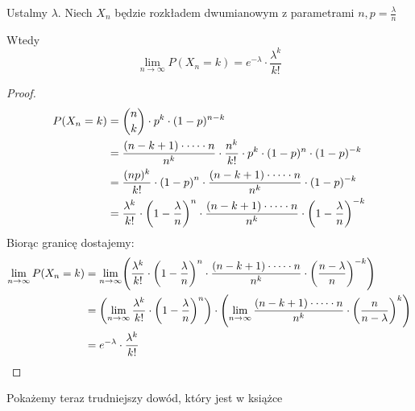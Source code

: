 \begin{theorem}
    Ustalmy \( \lambda \).
    Niech \( X_n \) będzie rozkładem dwumianowym z parametrami \( n,  p = \frac{\lambda}{n} \)
    
    Wtedy
    \[
        \lim_{n \rightarrow \infty} P(X_n = k) = e^{-\lambda} \cdot \frac{\lambda^k}{k!}
    \]
\end{theorem}
\begin{proof}
    \begin{align*}
        P(X_n = k) 
            &= \binom{n}{k} \cdot p^k \cdot (1-p)^{n-k} \\
            &= \frac{(n-k+1)\cdot \dots \cdot n}{n^k} \cdot \frac{n^k}{k!} \cdot p^k \cdot (1-p)^n \cdot (1-p)^{-k} \\
            &= \frac{(np)^k}{k!} \cdot \left(1 - p\right)^{n} \cdot
            \frac{(n-k+1)\cdot \dots \cdot n}{n^k} \cdot (1-p)^{-k} \\
            &= \frac{\lambda^k}{k!} \cdot \left(1 - \frac{\lambda}{n}\right)^{n} \cdot \frac{(n-k+1)\cdot \dots \cdot n}{n^k} \cdot \left(1-\frac{\lambda}{n}\right)^{-k} \\
    \end{align*}
    Biorąc granicę dostajemy:
    \begin{align*}
        \lim_{n \rightarrow \infty} P(X_n = k) 
            &= 
              \lim_{n \rightarrow \infty} \pars{ \frac{\lambda^k}{k!} \cdot \pars{1 - \frac{\lambda}{n}}^{n} \cdot \frac{(n-k+1)\cdot \dots \cdot n}{n^k} \cdot \pars{\frac{n - \lambda}{n}}^{-k}} \\
            &= \pars{\lim_{n \rightarrow \infty} \frac{\lambda^k}{k!} \cdot \pars{1 - \frac{\lambda}{n}}^{n}}
                \cdot
                \pars{
                \lim_{n \rightarrow \infty}\frac{(n-k+1)\cdot \dots \cdot n}{n^k} \cdot \pars{\frac{n}{n - \lambda}}^{k}
                } \\
            &= e^{-\lambda} \cdot \frac{\lambda^k}{k!}
    \end{align*}
\end{proof}

Pokażemy teraz trudniejszy dowód, który jest w książce

